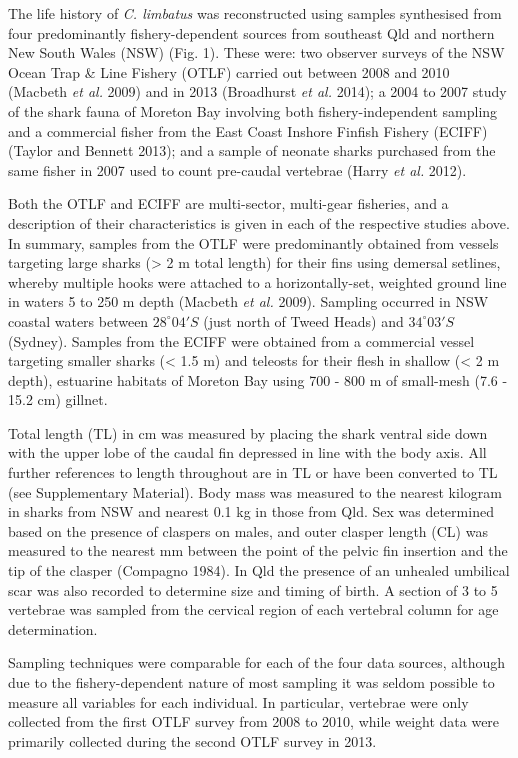 \documentclass[]{article}
\begin{document}
The life history of \emph{C. limbatus} was reconstructed using samples
synthesised from four predominantly fishery-dependent sources from
southeast Qld and northern New South Wales (NSW) (Fig. 1). These were:
two observer surveys of the NSW Ocean Trap \& Line Fishery (OTLF)
carried out between 2008 and 2010 (Macbeth \emph{et al.} 2009) and in
2013 (Broadhurst \emph{et al.} 2014); a 2004 to 2007 study of the shark
fauna of Moreton Bay involving both fishery-independent sampling and a
commercial fisher from the East Coast Inshore Finfish Fishery (ECIFF)
(Taylor and Bennett 2013); and a sample of neonate sharks purchased from
the same fisher in 2007 used to count pre-caudal vertebrae (Harry
\emph{et al.} 2012).

Both the OTLF and ECIFF are multi-sector, multi-gear fisheries, and a
description of their characteristics is given in each of the respective
studies above. In summary, samples from the OTLF were predominantly
obtained from vessels targeting large sharks (\textgreater{} 2 m total
length) for their fins using demersal setlines, whereby multiple hooks
were attached to a horizontally-set, weighted ground line in waters 5 to
250 m depth (Macbeth \emph{et al.} 2009). Sampling occurred in NSW
coastal waters between \(28^\circ 04'S\) (just north of Tweed Heads) and
\(34^\circ 03'S\) (Sydney). Samples from the ECIFF were obtained from a
commercial vessel targeting smaller sharks (\textless{} 1.5 m) and
teleosts for their flesh in shallow (\textless{} 2 m depth), estuarine
habitats of Moreton Bay using 700 - 800 m of small-mesh (7.6 - 15.2 cm)
gillnet.

Total length (TL) in cm was measured by placing the shark ventral side
down with the upper lobe of the caudal fin depressed in line with the
body axis. All further references to length throughout are in TL or have
been converted to TL (see Supplementary Material). Body mass was
measured to the nearest kilogram in sharks from NSW and nearest 0.1 kg
in those from Qld. Sex was determined based on the presence of claspers
on males, and outer clasper length (CL) was measured to the nearest mm
between the point of the pelvic fin insertion and the tip of the clasper
(Compagno 1984). In Qld the presence of an unhealed umbilical scar was
also recorded to determine size and timing of birth. A section of 3 to 5
vertebrae was sampled from the cervical region of each vertebral column
for age determination.

Sampling techniques were comparable for each of the four data sources,
although due to the fishery-dependent nature of most sampling it was
seldom possible to measure all variables for each individual. In
particular, vertebrae were only collected from the first OTLF survey
from 2008 to 2010, while weight data were primarily collected during the
second OTLF survey in 2013.
\end{document}
